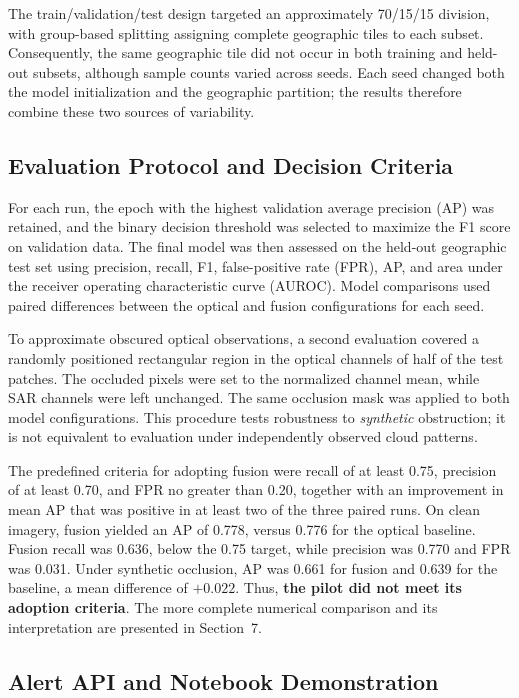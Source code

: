 \documentclass{article}
\begin{document}
The train/validation/test design targeted an approximately 70/15/15 division, with group-based splitting assigning complete geographic tiles to each subset. Consequently, the same geographic tile did not occur in both training and held-out subsets, although sample counts varied across seeds. Each seed changed both the model initialization and the geographic partition; the results therefore combine these two sources of variability.

\subsection{Evaluation Protocol and Decision Criteria}
\label{subsec:prototype-evaluation}

For each run, the epoch with the highest validation average precision (AP) was retained, and the binary decision threshold was selected to maximize the F1 score on validation data. The final model was then assessed on the held-out geographic test set using precision, recall, F1, false-positive rate (FPR), AP, and area under the receiver operating characteristic curve (AUROC). Model comparisons used paired differences between the optical and fusion configurations for each seed.

To approximate obscured optical observations, a second evaluation covered a randomly positioned rectangular region in the optical channels of half of the test patches. The occluded pixels were set to the normalized channel mean, while SAR channels were left unchanged. The same occlusion mask was applied to both model configurations. This procedure tests robustness to \emph{synthetic} obstruction; it is not equivalent to evaluation under independently observed cloud patterns.

The predefined criteria for adopting fusion were recall of at least 0.75, precision of at least 0.70, and FPR no greater than 0.20, together with an improvement in mean AP that was positive in at least two of the three paired runs. On clean imagery, fusion yielded an AP of 0.778, versus 0.776 for the optical baseline. Fusion recall was 0.636, below the 0.75 target, while precision was 0.770 and FPR was 0.031. Under synthetic occlusion, AP was 0.661 for fusion and 0.639 for the baseline, a mean difference of $+0.022$. Thus, \textbf{the pilot did not meet its adoption criteria}. The more complete numerical comparison and its interpretation are presented in Section~7.

\subsection{Alert API and Notebook Demonstration}
\label{subsec:prototype-api}
\end{document}
